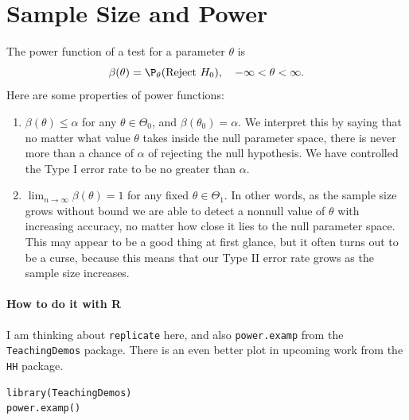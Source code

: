 \documentclass[captions=tableheading]{scrbook}
\begin{document}
\section{Sample Size and Power}
\label{sec-10-6}

\label{sec:Sample-Size-and-Power}

The power function of a test for a parameter \(\theta\) is
\[
\beta(\theta)=\P_{\theta}(\mbox{Reject }H_{0}),\quad-\infty<\theta<\infty.
\]
Here are some properties of power functions:
\begin{enumerate}
\item \(\beta(\theta)\leq\alpha\) for any \(\theta\in\Theta_{0}\), and \(\beta(\theta_{0})=\alpha\). We interpret this by saying that no matter what value \(\theta\) takes inside the null parameter space, there is never more than a chance of \(\alpha\) of rejecting the null hypothesis. We have controlled the Type I error rate to be no greater than \(\alpha\).
\item \(\lim_{n\to\infty}\beta(\theta)=1\) for any fixed \(\theta\in\Theta_{1}\). In other words, as the sample size grows without bound we are able to detect a nonnull value of \(\theta\) with increasing accuracy, no matter how close it lies to the null parameter space. This may appear to be a good thing at first glance, but it often turns out to be a curse, because this means that our Type II error rate grows as the sample size increases.
\end{enumerate}

\paragraph*{How to do it with \textsf{R}}

I am thinking about \texttt{replicate} here, and also \texttt{power.examp} from the \texttt{TeachingDemos} package. There is an even better plot in upcoming work from the \texttt{HH} package.



\begin{verbatim}
library(TeachingDemos)
power.examp()
\end{verbatim}
\end{document}

